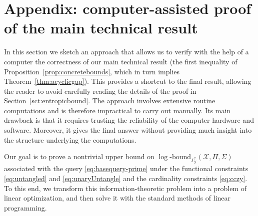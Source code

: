\documentclass[a4paper,cleveref]{lipics-v2021}
\newcommand{\logb}{\mathrm{\log\text{-}bound}}
\newcommand{\vset}[1]{\mathcal{#1}}
\begin{document}



\appendix

\section{Appendix: computer-assisted proof of the main technical result}
\label{sct:appendix}

In this section we sketch an approach that allows us to verify with the help of a computer the correctness of our main technical result (the first inequality of Proposition~\ref{prop:concretebounds}, 
which in turn implies Theorem~\ref{thm:acyclicgap}). This provides a shortcut to the final result, allowing the reader to avoid carefully reading the details of the proof in Section~\ref{sct:entropicbound}. 
The approach involves extensive routine computations and is therefore impractical to carry out manually. Its main drawback is that it requires trusting the reliability of the computer hardware and software. 
Moreover, it gives the final answer without providing much insight into the structure underlying the computations.

Our goal is to prove a nontrivial upper bound on $\logb_{\Gamma^*_{\vset Y}}(\vset X, \Pi, \Sigma)$ associated with the query \eqref{eq:basequery-prime}
under the functional constraints \eqref{eq:untangled} and \eqref{eq:unaryUntangle} and the cardinality constraints \eqref{eq:cczy}.
To this end, we transform this information-theoretic problem into a problem of linear optimization, and then solve it with the standard methods of linear programming.
\end{document}
